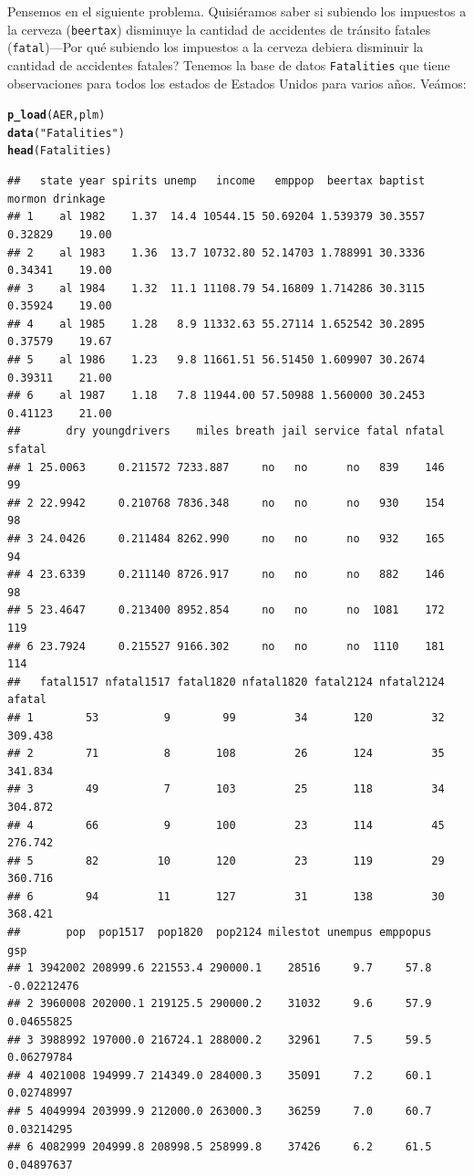 \documentclass[onesided]{article}\usepackage[]{graphicx}\usepackage[]{color}
\makeatletter
\newcommand{\hlstr}[1]{\textcolor[rgb]{0.192,0.494,0.8}{#1}}%
\newcommand{\hlstd}[1]{\textcolor[rgb]{0.345,0.345,0.345}{#1}}%
\newcommand{\hlkwd}[1]{\textcolor[rgb]{0.737,0.353,0.396}{\textbf{#1}}}%
\newenvironment{kframe}{%
 \def\at@end@of@kframe{}%
 \ifinner\ifhmode%
  \def\at@end@of@kframe{\end{minipage}}%
  \begin{minipage}{\columnwidth}%
 \fi\fi%
 \def\FrameCommand##1{\hskip\@totalleftmargin \hskip-\fboxsep
 \colorbox{shadecolor}{##1}\hskip-\fboxsep
     \hskip-\linewidth \hskip-\@totalleftmargin \hskip\columnwidth}%
 \MakeFramed {\advance\hsize-\width
   \@totalleftmargin\z@ \linewidth\hsize
   \@setminipage}}%
 {\par\unskip\endMakeFramed%
 \at@end@of@kframe}
\newenvironment{knitrout}{}{} %
\makeatother
\begin{document}
Pensemos en el siguiente problema. Quisi\'eramos saber si subiendo los impuestos a la cerveza (\texttt{beertax}) disminuye la cantidad de accidentes de tr\'ansito fatales (\texttt{fatal})---{\color{red}Por qu\'e subiendo los impuestos a la cerveza debiera disminuir la cantidad de accidentes fatales?} Tenemos la base de datos \texttt{Fatalities} que tiene observaciones para todos los estados de Estados Unidos para varios a\~nos. Ve\'amos:

\begin{knitrout}
\color{fgcolor}\begin{kframe}
\begin{alltt}
\hlkwd{p_load}\hlstd{(AER, plm)}
\hlkwd{data}\hlstd{(}\hlstr{"Fatalities"}\hlstd{)}
\hlkwd{head}\hlstd{(Fatalities)}
\end{alltt}
\begin{verbatim}
##   state year spirits unemp   income   emppop  beertax baptist  mormon drinkage
## 1    al 1982    1.37  14.4 10544.15 50.69204 1.539379 30.3557 0.32829    19.00
## 2    al 1983    1.36  13.7 10732.80 52.14703 1.788991 30.3336 0.34341    19.00
## 3    al 1984    1.32  11.1 11108.79 54.16809 1.714286 30.3115 0.35924    19.00
## 4    al 1985    1.28   8.9 11332.63 55.27114 1.652542 30.2895 0.37579    19.67
## 5    al 1986    1.23   9.8 11661.51 56.51450 1.609907 30.2674 0.39311    21.00
## 6    al 1987    1.18   7.8 11944.00 57.50988 1.560000 30.2453 0.41123    21.00
##       dry youngdrivers    miles breath jail service fatal nfatal sfatal
## 1 25.0063     0.211572 7233.887     no   no      no   839    146     99
## 2 22.9942     0.210768 7836.348     no   no      no   930    154     98
## 3 24.0426     0.211484 8262.990     no   no      no   932    165     94
## 4 23.6339     0.211140 8726.917     no   no      no   882    146     98
## 5 23.4647     0.213400 8952.854     no   no      no  1081    172    119
## 6 23.7924     0.215527 9166.302     no   no      no  1110    181    114
##   fatal1517 nfatal1517 fatal1820 nfatal1820 fatal2124 nfatal2124  afatal
## 1        53          9        99         34       120         32 309.438
## 2        71          8       108         26       124         35 341.834
## 3        49          7       103         25       118         34 304.872
## 4        66          9       100         23       114         45 276.742
## 5        82         10       120         23       119         29 360.716
## 6        94         11       127         31       138         30 368.421
##       pop  pop1517  pop1820  pop2124 milestot unempus emppopus         gsp
## 1 3942002 208999.6 221553.4 290000.1    28516     9.7     57.8 -0.02212476
## 2 3960008 202000.1 219125.5 290000.2    31032     9.6     57.9  0.04655825
## 3 3988992 197000.0 216724.1 288000.2    32961     7.5     59.5  0.06279784
## 4 4021008 194999.7 214349.0 284000.3    35091     7.2     60.1  0.02748997
## 5 4049994 203999.9 212000.0 263000.3    36259     7.0     60.7  0.03214295
## 6 4082999 204999.8 208998.5 258999.8    37426     6.2     61.5  0.04897637
\end{verbatim}
\end{kframe}
\end{knitrout}
\end{document}
